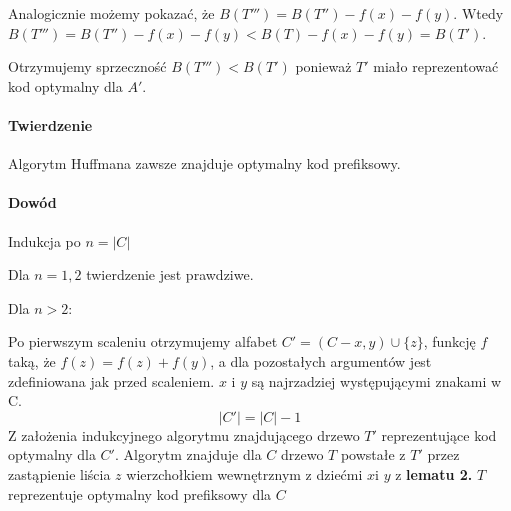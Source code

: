 Analogicznie możemy pokazać, że $B(T''') = B(T'') - f(x) - f(y)$. Wtedy $B(T''') = B(T'') - f(x) - f(y) < B(T) - f(x) - f(y) = B(T')$. 

Otrzymujemy sprzeczność $B(T''') < B(T')$ ponieważ $T'$ miało reprezentować kod optymalny dla $A'$.

\paragraph{Twierdzenie} Algorytm Huffmana zawsze znajduje optymalny kod prefiksowy.
\paragraph{Dowód} {Indukcja po $n = |C|$}

Dla $n = 1,2$ twierdzenie jest prawdziwe.

Dla $n > 2$:

Po pierwszym scaleniu otrzymujemy alfabet $C' = (C - {x,y}) \cup \{z\}$, funkcję $f$ taką, że $f(z) = f(z) + f(y)$, a dla pozostałych argumentów jest zdefiniowana jak przed scaleniem. $x$ i $y$ są najrzadziej występującymi znakami w C. 
$$|C'| = |C| - 1$$
Z założenia indukcyjnego algorytmu znajdującego drzewo $T'$ reprezentujące kod optymalny dla $C'$. Algorytm znajduje dla $C$ drzewo $T$ powstałe z $T'$ przez zastąpienie liścia $z$ wierzchołkiem wewnętrznym z dziećmi $x$i $y$ z \textbf{lematu 2.} $T$ reprezentuje optymalny kod prefiksowy dla $C$




